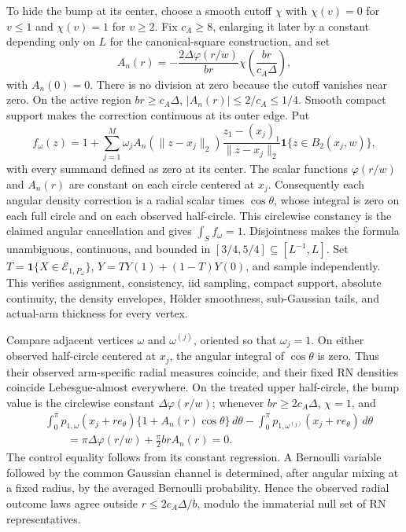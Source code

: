 To hide the bump at its center, choose a smooth cutoff \(\chi\) with \(\chi(v)=0\) for \(v\leq1\) and \(\chi(v)=1\) for \(v\geq2\).  Fix \(c_A\geq8\), enlarging it later by a constant depending only on \(L\) for the canonical-square construction, and set
\[
 A_n(r)=-\frac{2\Delta\varphi(r/w)}{br}
 \chi\!\left(\frac{br}{c_A\Delta}\right),
\]
with \(A_n(0)=0\).  There is no division at zero because the cutoff vanishes near zero.  On the active region \(br\geq c_A\Delta\), \(|A_n(r)|\leq2/c_A\leq1/4\).  Smooth compact support makes the correction continuous at its outer edge.  Put
\[
 f_\omega(z)=1+\sum_{j=1}^M\omega_j
 A_n(\lVert z-x_j\rVert_2)
 \frac{z_1-(x_j)_1}{\lVert z-x_j\rVert_2}
 \mathbf1\{z\in B_2(x_j,w)\},
\]
with every summand defined as zero at its center.  The scalar functions \(\varphi(r/w)\) and \(A_n(r)\) are constant on each circle centered at \(x_j\).  Consequently each angular density correction is a radial scalar times \(\cos\theta\), whose integral is zero on each full circle and on each observed half-circle.  This circlewise constancy is the claimed angular cancellation and gives \(\int_Sf_\omega=1\).  Disjointness makes the formula unambiguous, continuous, and bounded in \([3/4,5/4]\subseteq[L^{-1},L]\).  Set \(T=\mathbf1\{X\in\mathcal E_{1,P_\omega}\}\), \(Y=TY(1)+(1-T)Y(0)\), and sample independently.  This verifies assignment, consistency, iid sampling, compact support, absolute continuity, the density envelopes, H\"older smoothness, sub-Gaussian tails, and actual-arm thickness for every vertex.

Compare adjacent vertices \(\omega\) and \(\omega^{(j)}\), oriented so that \(\omega_j=1\).  On either observed half-circle centered at \(x_j\), the angular integral of \(\cos\theta\) is zero.  Thus their observed arm-specific radial measures coincide, and their fixed RN densities coincide Lebesgue-almost everywhere.  On the treated upper half-circle, the bump value is the circlewise constant \(\Delta\varphi(r/w)\); whenever \(br\geq2c_A\Delta\), \(\chi=1\), and
\[
\begin{aligned}
 &\int_0^\pi p_{1,\omega}(x_j+re_\theta)
 \{1+A_n(r)\cos\theta\}\,d\theta
 -\int_0^\pi p_{1,\omega^{(j)}}(x_j+re_\theta)\,d\theta\\
 &\qquad=\pi\Delta\varphi(r/w)+\frac\pi2brA_n(r)=0.
\end{aligned}
\]
The control equality follows from its constant regression.  A Bernoulli variable followed by the common Gaussian channel is determined, after angular mixing at a fixed radius, by the averaged Bernoulli probability.  Hence the observed radial outcome laws agree outside \(r\leq2c_A\Delta/b\), modulo the immaterial null set of RN representatives.

